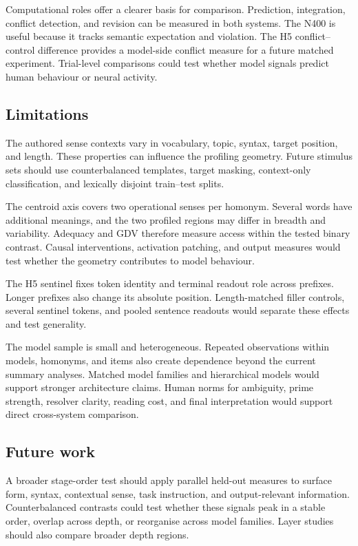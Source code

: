 \documentclass[conference]{IEEEtran}
\begin{document}
Computational roles offer a clearer basis for comparison. Prediction,
integration, conflict detection, and revision can be measured in both systems.
The N400 is useful because it tracks semantic expectation and violation. The
H5 conflict--control difference provides a model-side conflict measure for a
future matched experiment. Trial-level comparisons could test whether model
signals predict human behaviour or neural activity.

\subsection{Limitations}
\label{sec:discussion-limitations}

The authored sense contexts vary in vocabulary, topic, syntax, target position,
and length. These properties can influence the profiling geometry. Future
stimulus sets should use counterbalanced templates, target masking,
context-only classification, and lexically disjoint train--test splits.

The centroid axis covers two operational senses per homonym. Several words
have additional meanings, and the two profiled regions may differ in breadth
and variability. Adequacy and GDV therefore measure access within the tested
binary contrast. Causal interventions, activation patching, and output measures
would test whether the geometry contributes to model behaviour.

The H5 sentinel fixes token identity and terminal readout role across prefixes.
Longer prefixes also change its absolute position. Length-matched filler
controls, several sentinel tokens, and pooled sentence readouts would separate
these effects and test generality.

The model sample is small and heterogeneous. Repeated observations within
models, homonyms, and items also create dependence beyond the current summary
analyses. Matched model families and hierarchical models would support stronger
architecture claims. Human norms for ambiguity, prime strength, resolver
clarity, reading cost, and final interpretation would support direct
cross-system comparison.

\subsection{Future work}
\label{sec:discussion-future}

A broader stage-order test should apply parallel held-out measures to surface
form, syntax, contextual sense, task instruction, and output-relevant
information. Counterbalanced contrasts could test whether these signals peak
in a stable order, overlap across depth, or reorganise across model families.
Layer studies should also compare broader depth regions.
\end{document}
